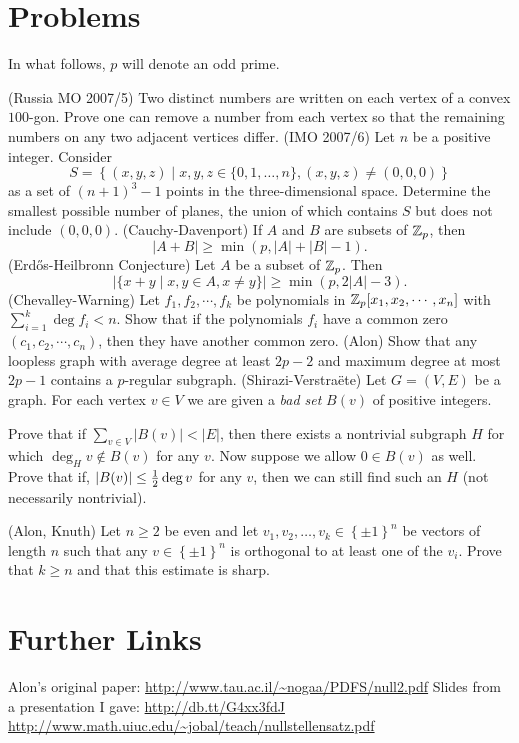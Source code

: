 \documentclass[11pt]{scrartcl}
\begin{document}
\section{Problems}
In what follows, $p$ will denote an odd prime.
\begin{enumerate}
  \ii (Russia MO 2007/5) Two distinct numbers are written on each vertex of a convex $100$-gon. Prove one can remove a number from each vertex so that the remaining numbers on any two adjacent vertices differ.
  \ii (IMO 2007/6) Let $n$ be a positive integer. Consider \[ S = \left\{ (x,y,z) \mid x,y,z \in \{ 0, 1, \ldots, n\}, (x,y,z) \neq (0,0,0) \right \} \] as a set of $(n + 1)^{3} - 1$ points in the three-dimensional space. Determine the smallest possible number of planes, the union of which contains $S$ but does not include $(0,0,0)$.
  \ii (Cauchy-Davenport) If $A$ and $B$ are subsets of $\mathbb Z_p$, then \[ |A+B| \ge \min(p, |A| + |B| - 1). \]
  \ii (Erd\H{o}s-Heilbronn Conjecture) Let $A$ be a subset of $\mathbb Z_p$.  Then \[ |\{x+y \mid x,y \in A, x \neq y \} | \ge \min(p, 2|A|-3). \]
  \ii (Chevalley-Warning) Let $f_1,f_2,\cdots,f_k$ be polynomials in $\mathbb Z_p[x_1,x_2,\cdots,x_n]$ with $\sum_{i=1}^k \deg f_i < n$.  Show that if the polynomials $f_i$ have a common zero $(c_1,c_2,\cdots,c_n)$, then they have another common zero.
  \ii (Alon) Show that any loopless graph with average degree at least $2p-2$ and maximum degree at most $2p-1$ contains a $p$-regular subgraph.
  \ii (Shirazi-Verstra\"ete) Let $G=(V,E)$ be a graph. For each vertex $v \in V$ we are given a \emph{bad set} $B(v)$ of positive integers.
  \begin{enumerate}[(i)]
    \ii Prove that if $\sum_{v \in V} \left\lvert B(v) \right\rvert < \left\lvert E \right\rvert$, then there exists a nontrivial subgraph $H$ for which $\deg_H v \notin B(v)$ for any $v$.
    \ii Now suppose we allow $0 \in B(v)$ as well. Prove that if, $\left\lvert B(v) \right\rvert \le \frac{1}{2} \deg v$ for any $v$, then we can still find such an $H$ (not necessarily nontrivial).
  \end{enumerate}
  \ii (Alon, Knuth) Let $n \ge 2$ be even and let $v_1, v_2, \dots, v_k \in \left\{ \pm 1 \right\}^n$ be vectors of length $n$ such that any $v \in \left\{ \pm 1 \right\}^n$ is orthogonal to at least one of the $v_i$.  Prove that $k \ge n$ and that this estimate is sharp.
\end{enumerate}

\section{Further Links}
\begin{itemize}
  \ii Alon's original paper: \url{http://www.tau.ac.il/~nogaa/PDFS/null2.pdf}
  \ii Slides from a presentation I gave: \url{http://db.tt/G4xx3fdJ}
  \ii \url{http://www.math.uiuc.edu/~jobal/teach/nullstellensatz.pdf}
\end{itemize}
\end{document}
